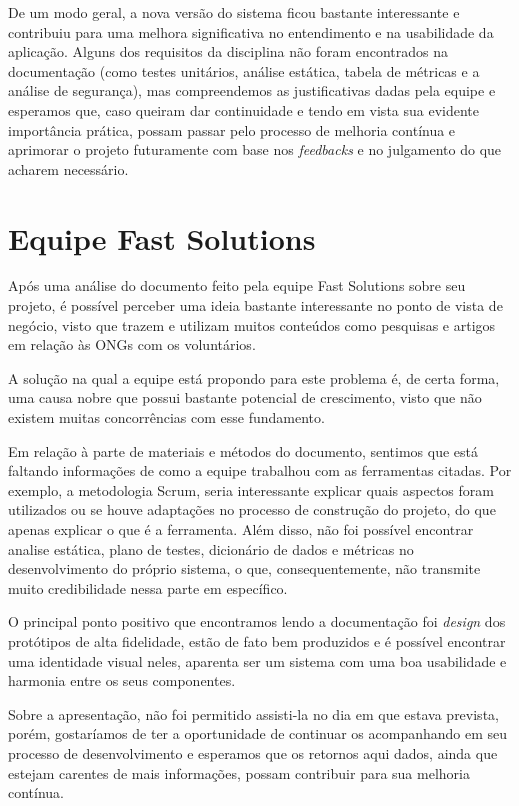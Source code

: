 De um modo geral, a nova versão do sistema ficou bastante interessante e contribuiu para uma melhora significativa no entendimento e na usabilidade da aplicação. Alguns dos requisitos da disciplina não foram encontrados na documentação (como testes unitários, análise estática, tabela de métricas e a análise de segurança), mas compreendemos as justificativas dadas pela equipe e esperamos que, caso queiram dar continuidade e tendo em vista sua evidente importância prática, possam passar pelo processo de melhoria contínua e aprimorar o projeto futuramente com base nos \textsl{feedbacks} e no julgamento do que acharem necessário.

\section{Equipe Fast Solutions}
Após uma análise do documento feito pela equipe Fast Solutions sobre seu projeto, é possível perceber uma ideia bastante interessante no ponto de vista de negócio, visto que trazem e utilizam muitos conteúdos como pesquisas e artigos em relação às ONGs com os voluntários. 

A solução na qual a equipe está propondo para este problema é, de certa forma, uma causa nobre que possui bastante potencial de crescimento, visto que não existem muitas concorrências com esse fundamento.

Em relação à parte de materiais e métodos do documento, sentimos que está faltando informações de como a equipe trabalhou com as ferramentas citadas. Por exemplo, a metodologia Scrum, seria interessante explicar quais aspectos foram utilizados  ou se houve adaptações no processo de construção do projeto, do que apenas explicar o que é a ferramenta. Além disso, não foi possível encontrar analise estática, plano de testes, dicionário de dados e métricas no desenvolvimento do próprio sistema, o que, consequentemente, não transmite muito credibilidade nessa parte em específico. 

O principal ponto positivo que encontramos lendo a documentação foi \textsl{design} dos protótipos de alta fidelidade, estão de fato bem produzidos e é possível encontrar uma identidade visual neles, aparenta ser um sistema com uma boa usabilidade e harmonia entre os seus componentes.

Sobre a apresentação, não foi permitido assisti-la no dia em que estava prevista, porém, gostaríamos de ter a oportunidade de continuar os acompanhando em seu processo de desenvolvimento e esperamos que os retornos aqui dados, ainda que estejam carentes de mais informações, possam contribuir para sua melhoria contínua.

